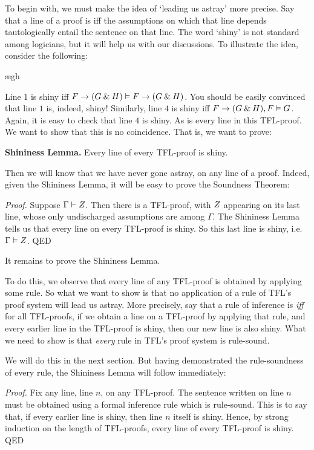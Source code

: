 To begin with, we must make the idea of `leading us astray' more precise. Say that a line of a proof is  iff the assumptions on which that line depends tautologically entail the sentence on that line. {The word `shiny' is not standard among logicians, but it will help us with our discussions.} To illustrate the idea, consider the following:
	\begin{pf}
		\open
			\ae{gh}
		\close
	\end{pf}\noindent\noindent
Line $1$ is shiny iff $F \rightarrow (G \mathbin{\&} H) \vDash F \rightarrow (G \mathbin{\&} H)$. You should be easily convinced that line $1$ is, indeed, shiny! Similarly, line $4$ is shiny iff $F \rightarrow (G \mathbin{\&} H), F \vDash G$. Again, it is easy to check that line $4$ is shiny. As is every line in this TFL-proof. We want to show that this is no coincidence. That is, we want to prove:
	\begin{highlighted}\textbf{Shininess Lemma.}
		Every line of every TFL-proof is shiny.
	\end{highlighted}\noindent
Then we will know that we have never gone astray, on any line of a proof. Indeed, given the Shininess Lemma, it will be easy to prove the Soundness Theorem:

\emph{Proof.} Suppose $\Gamma \vdash Z$. Then there is a TFL-proof, with $Z$ appearing on its last line, whose only undischarged assumptions are among $\Gamma$. The Shininess Lemma tells us that every line on every TFL-proof is shiny. So this last line is shiny, i.e.\ $\Gamma \vDash Z$. QED

It remains to prove the Shininess Lemma.

To do this, we observe that every line of any TFL-proof is obtained by applying some rule. So what we want to show is that no application of a rule of TFL's proof system will lead us astray. More precisely, say that a rule of inference is  \emph{iff} for all TFL-proofs, if we obtain a line on a TFL-proof by applying that rule, and every earlier line in the TFL-proof is shiny, then our new line is also shiny. What we need to show is that \emph{every} rule in TFL's proof system is rule-sound.

We will do this in the next section. But having demonstrated the rule-soundness of every rule, the Shininess Lemma will follow immediately:

\emph{Proof.} Fix any line, line $n$, on any TFL-proof. The sentence written on line $n$ must be obtained using a formal inference rule which is rule-sound. This is to say that, if every earlier line is shiny, then line $n$ itself is shiny. Hence, by strong induction on the length of TFL-proofs, every line of every TFL-proof is shiny. QED

